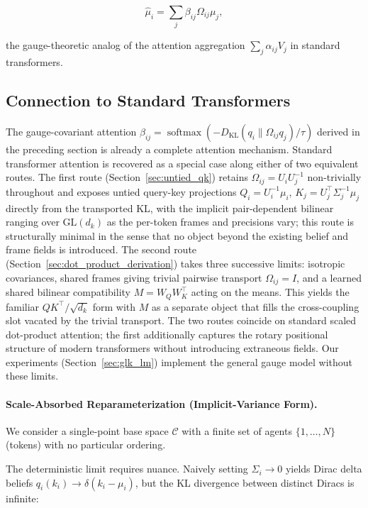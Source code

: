 \documentclass[twoside,11pt]{article}
\begin{document}
\begin{equation}
\hat\mu_i = \sum_j \beta_{ij} \Omega_{ij}\mu_j,
\end{equation}

the gauge-theoretic analog of the attention aggregation $\sum_j \alpha_{ij} V_j$ in standard transformers.

\subsection{Connection to Standard Transformers}\label{sec:transformer_limit}

The gauge-covariant attention $\beta_{ij} = \operatorname{softmax}(-D_{\mathrm{KL}}(q_i \| \Omega_{ij} q_j)/\tau)$ derived in the preceding section is already a complete attention mechanism. Standard transformer attention is recovered as a special case along either of two equivalent routes. The first route (Section~\ref{sec:untied_qk}) retains $\Omega_{ij} = U_iU_j^{-1}$ non-trivially throughout and exposes untied query-key projections $Q_i = U_i^{-1}\mu_i$, $K_j = U_j^\top\Sigma_j^{-1}\mu_j$ directly from the transported KL, with the implicit pair-dependent bilinear ranging over $\mathrm{GL}(d_k)$ as the per-token frames and precisions vary; this route is structurally minimal in the sense that no object beyond the existing belief and frame fields is introduced. The second route (Section~\ref{sec:dot_product_derivation}) takes three successive limits: isotropic covariances, shared frames giving trivial pairwise transport $\Omega_{ij} = I$, and a learned shared bilinear compatibility $M = W_QW_K^\top$ acting on the means. This yields the familiar $QK^\top / \sqrt{d_k}$ form with $M$ as a separate object that fills the cross-coupling slot vacated by the trivial transport. The two routes coincide on standard scaled dot-product attention; the first additionally captures the rotary positional structure of modern transformers without introducing extraneous fields. Our experiments (Section~\ref{sec:glk_lm}) implement the general gauge model without these limits.

\paragraph{Scale-Absorbed Reparameterization (Implicit-Variance Form).}

We consider a single-point base space $\mathcal{C}$ with a finite set of agents $\{1,\dots,N\}$ (tokens) with no particular ordering. 

The deterministic limit requires nuance. Naively setting $\Sigma_i \to 0$ yields Dirac delta beliefs $q_i(k_i) \to \delta(k_i - \mu_i)$, but the KL divergence between distinct Diracs is infinite:
\end{document}
